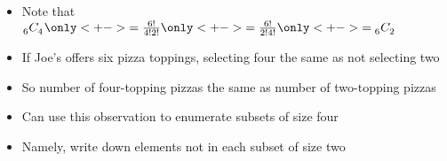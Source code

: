 \documentclass{beamer}
\theoremstyle{definition}
\newcommand\ncr[2]{\tensor[_{#1}]C{_{#2}}}
\begin{document}
\begin{frame}
\begin{multicols}{2}
\begin{itemize}
\item Note that $\ncr{6}{4}
\only<+->{=\frac{6!}{4!2!}}
\only<+->{=\frac{6!}{2!4!}}
\only<+->{=\ncr{6}{2}}$
\item If Joe's offers six pizza toppings,
selecting four the same as \alert{not}
selecting two
\item So number of four-topping pizzas
the same as number of two-topping pizzas
\item Can use this observation to enumerate
subsets of size four
\item Namely,
write down elements \alert{not} in 
each subset of size two
\end{itemize}
\columnbreak
{}
\end{multicols}
\end{frame}
\end{document}
